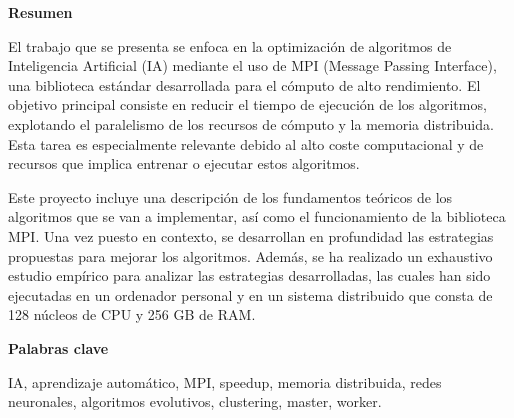 
\newpage

\thispagestyle{empty}

\begin{center}

{\bf \Huge Resumen}

  \end{center}
\vspace{1cm}

El trabajo que se presenta se enfoca en la optimización de algoritmos de Inteligencia  Artificial (IA) mediante el uso de MPI (Message Passing Interface), una biblioteca estándar desarrollada para el cómputo de alto rendimiento. 
El objetivo principal consiste en reducir el tiempo de ejecución de los algoritmos, explotando el paralelismo de los recursos de cómputo y la memoria distribuida. Esta tarea es especialmente relevante debido al alto coste computacional y de recursos que implica entrenar o ejecutar estos algoritmos.

Este proyecto incluye una descripción de los fundamentos teóricos de los algoritmos que se van a implementar, así como el funcionamiento de la biblioteca MPI. 
Una vez puesto en contexto, se desarrollan en profundidad las estrategias propuestas para mejorar los algoritmos.
Además, se ha realizado un exhaustivo estudio empírico para analizar las estrategias desarrolladas, las cuales han sido ejecutadas en un ordenador personal y en un sistema distribuido que consta de 128 núcleos de CPU y 256 GB de RAM.



\vspace{1cm}


\begin{center}

{\bf \Large Palabras clave}

   \end{center}

   \vspace{0.5cm}
   
   IA, aprendizaje automático, MPI, speedup, memoria distribuida, redes neuronales, algoritmos evolutivos, clustering, master, worker.
   
   


